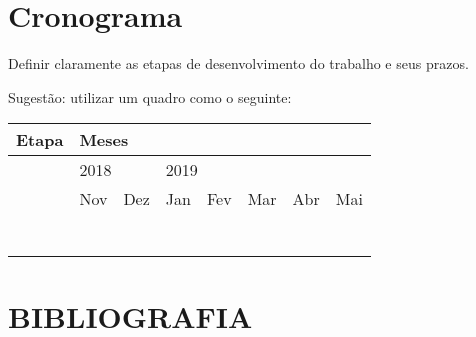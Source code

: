 \documentclass[prop-esp]{iiufrgs}
\begin{document}
\chapter{Cronograma}

\noindent Definir claramente as etapas de desenvolvimento do trabalho e seus prazos.

\noindent 

\noindent Sugest\~{a}o: utilizar um quadro como o seguinte:

\noindent 

\begin{tabular}{|p{1.8in}|p{0.3in}|p{0.3in}|p{0.3in}|p{0.3in}|p{0.3in}|p{0.3in}|p{0.3in}|} \hline 
Etapa & \multicolumn{7}{|p{2.0in}|}{Meses} \\ \hline 
 & \multicolumn{2}{|p{0.6in}|}{2018} & \multicolumn{5}{|p{1.4in}|}{2019} \\ \hline 
 & Nov & Dez & Jan & Fev & Mar & Abr & Mai \\ \hline 
 &  &  &  &  &  &  &  \\ \hline 
 &  &  &  &  &  &  &  \\ \hline 
 &  &  &  &  &  &  &  \\ \hline 
 &  &  &  &  &  &  &  \\ \hline 
 &  &  &  &  &  &  &  \\ \hline 
 &  &  &  &  &  &  &  \\ \hline 
 &  &  &  &  &  &  &  \\ \hline 
\end{tabular}



%
\chapter{BIBLIOGRAFIA}



\end{document}
